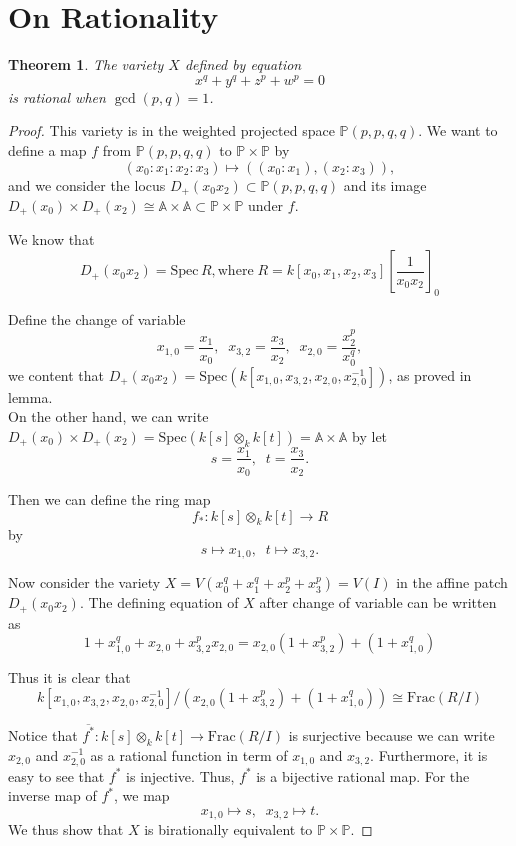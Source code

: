 \documentclass{article}
\renewcommand{\P}{\mathbb{P}}
\newcommand{\A}{\mathbb{A}}
\newcommand{\Pro}{\mathbb{P}}
\newcommand{\Frac}[0]{\mathrm{Frac}}
\newcommand{\Spec}[0]{\mathrm{Spec}}
\newtheorem{theorem}{Theorem}[section]
\theoremstyle{definition}
\theoremstyle{definition}
\theoremstyle{remark}
\begin{document}
\section{On Rationality}
\begin{theorem}
The variety $X$ defined by equation \[x^q + y^q + z^p + w^p = 0\] is rational when $\gcd(p, q) = 1$.
\end{theorem}
\begin{proof}
This variety is in the weighted projected space $\Pro(p,p,q,q)$. 
We want to define a map $f$ from $\Pro(p,p,q,q)$ to $\Pro \times \Pro$ by \[(x_0 : x_1 : x_2: x_3) \mapsto ((x_0:x_1), (x_2: x_3)),\] and we consider the locus $D_+(x_0x_2) \subset \Pro(p,p,q,q)$ and its image $D_+(x_0) \times D_+(x_2) \cong \A \times \A \subset \Pro \times \Pro$ under $f$.

We know that \[D_+(x_0x_2) = \Spec \,R \mathrm{, where} \; R = k\left[x_0, x_1, x_2, x_3\right]\left[\frac{1}{x_0x_2} \right]_0 \]

Define the change of variable \[x_{1,0} = \frac{x_1}{x_0}, \;\; x_{3,2} = \frac{x_3}{x_2}, \;\; x_{2,0} = \frac{x_2^p}{x_0^q},\]
we content that $D_+(x_0x_2) = \Spec(k[x_{1,0}, x_{3,2}, x_{2, 0}, x_{2, 0}^{-1}])$, as proved in lemma. \\

On the other hand, we can write $D_+(x_0) \times D_+(x_2) = \Spec(k[s] \otimes_k k[t]) = \A \times \A$ by let \[s = \frac{x_1}{x_0}, \;\; t = \frac{x_3}{x_2}.\]

Then we can define the ring map
\[f_*: k[s] \otimes_k k[t] \to R\] by \[s \mapsto x_{1,0}, \;\; t \mapsto x_{3,2}.\]

Now consider the variety $X = V(x_0^q + x_1^q  + x_2^p + x_3^p) = V(I)$ in the affine patch $D_+(x_0x_2)$. The defining equation of $X$ after change of variable can be written as
\[1 + x_{1,0}^q + x_{2,0} + x_{3,2}^p x_{2,0} = x_{2,0}(1 + x_{3,2}^p) + (1 + x_{1,0}^q)\]

Thus it is clear that \[k[x_{1,0}, x_{3,2}, x_{2, 0}, x_{2, 0}^{-1}]/(x_{2,0}(1 + x_{3,2}^p) + (1 + x_{1,0}^q)) \cong \Frac(R/I)\]

Notice that $\overline{f^*} : k[s] \otimes_k k[t] \to \Frac(R/I)$ is surjective because we can write $x_{2,0}$ and $x_{2,0}^{-1}$ as a rational function in term of $x_{1,0}$ and $x_{3,2}$. 
Furthermore, it is easy to see that $f^*$ is injective. Thus, $f^*$ is a bijective rational map. For the inverse map of $f^*$, we map 
\[x_{1,0} \mapsto s, \;\; x_{3,2} \mapsto t.\]
We thus show that $X$ is birationally equivalent to $\P \times \P$. 
\end{proof}
\end{document}
